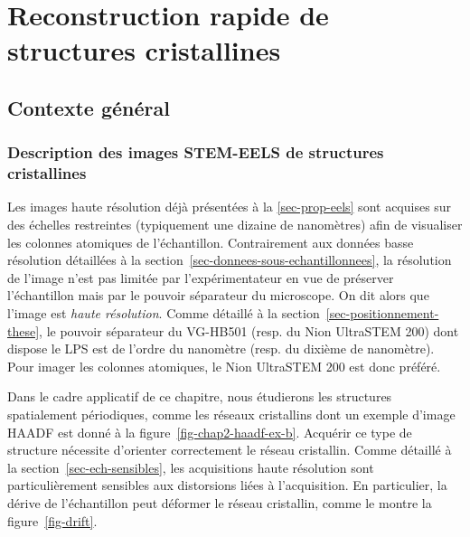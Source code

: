 \chapter{Reconstruction rapide de structures cristallines}
\label{ch-chapter_4}
\dochaptoc
%
\section{Contexte général}

\subsection{Description des images STEM-EELS de structures cristallines}

Les images haute résolution déjà présentées à la \cref{sec-prop-eels} sont acquises sur des échelles restreintes (typiquement une dizaine de nanomètres) afin de visualiser les colonnes atomiques de l'échantillon. 
%
Contrairement aux données basse résolution détaillées à la section~\ref{sec-donnees-sous-echantillonnees}, la résolution de l'image n'est pas limitée par l'expérimentateur en vue de préserver l'échantillon mais par le pouvoir séparateur du microscope. On dit alors que l'image est \emph{haute résolution}. Comme détaillé à la section~\ref{sec-positionnement-these}, le pouvoir séparateur du VG-HB501 (resp. du Nion UltraSTEM 200) dont dispose le LPS est de l'ordre du nanomètre (resp. du dixième de nanomètre). Pour imager les colonnes atomiques, le Nion UltraSTEM 200 est donc préféré.

Dans le cadre applicatif de ce chapitre, nous étudierons les structures spatialement périodiques, comme les réseaux cristallins dont un exemple d'image HAADF est donné à la figure~\ref{fig-chap2-haadf-ex-b}. Acquérir ce type de structure nécessite d'orienter correctement le réseau cristallin. 
%
Comme détaillé à la section~\ref{sec-ech-sensibles}, les acquisitions haute résolution sont particulièrement sensibles aux distorsions liées à l'acquisition. En particulier, la dérive de l'échantillon peut déformer le réseau cristallin, comme le montre la figure~\ref{fig-drift}.





